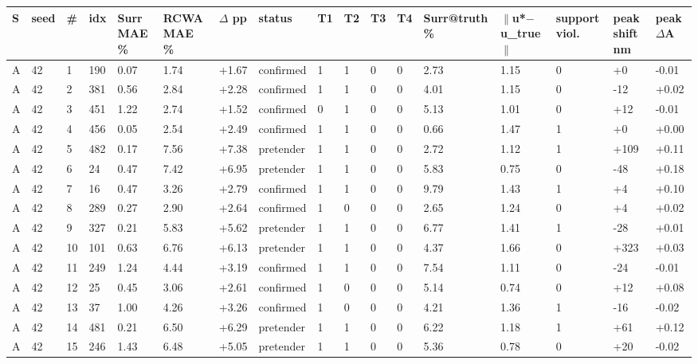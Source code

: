 \documentclass[11pt,a4paper]{article}
\newcounter{none}   %
\begin{document}
\begingroup
\setlength{\tabcolsep}{2pt}\tiny
{}
\label{stab:10}
{\def\LTcaptype{none} %
\begin{longtable}[]{@{}lllllllllllllllll@{}}
\toprule\noalign{}
S & seed & \# & idx & Surr MAE \% & RCWA MAE \% & \ensuremath{\Delta} pp & status & T1 & T2 & T3 & T4 & Surr@truth \% & \ensuremath{\|}u*\ensuremath{-}u\_true\ensuremath{\|} & support viol. & peak shift nm & peak \ensuremath{\Delta}A \\
\midrule\noalign{}
\endhead
\bottomrule\noalign{}
\endlastfoot
A & 42 & 1 & 190 & 0.07 & 1.74 & +1.67 & confirmed & 1 & 1 & 0 & 0 & 2.73 & 1.15 & 0 & +0 & -0.01 \\
A & 42 & 2 & 381 & 0.56 & 2.84 & +2.28 & confirmed & 1 & 1 & 0 & 0 & 4.01 & 1.15 & 0 & -12 & +0.02 \\
A & 42 & 3 & 451 & 1.22 & 2.74 & +1.52 & confirmed & 0 & 1 & 0 & 0 & 5.13 & 1.01 & 0 & +12 & -0.01 \\
A & 42 & 4 & 456 & 0.05 & 2.54 & +2.49 & confirmed & 1 & 1 & 0 & 0 & 0.66 & 1.47 & 1 & +0 & +0.00 \\
A & 42 & 5 & 482 & 0.17 & 7.56 & +7.38 & pretender & 1 & 1 & 0 & 0 & 2.72 & 1.12 & 1 & +109 & +0.11 \\
A & 42 & 6 & 24 & 0.47 & 7.42 & +6.95 & pretender & 1 & 1 & 0 & 0 & 5.83 & 0.75 & 0 & -48 & +0.18 \\
A & 42 & 7 & 16 & 0.47 & 3.26 & +2.79 & confirmed & 1 & 1 & 0 & 0 & 9.79 & 1.43 & 1 & +4 & +0.10 \\
A & 42 & 8 & 289 & 0.27 & 2.90 & +2.64 & confirmed & 1 & 0 & 0 & 0 & 2.65 & 1.24 & 0 & +4 & +0.02 \\
A & 42 & 9 & 327 & 0.21 & 5.83 & +5.62 & pretender & 1 & 1 & 0 & 0 & 6.77 & 1.41 & 1 & -28 & +0.01 \\
A & 42 & 10 & 101 & 0.63 & 6.76 & +6.13 & pretender & 1 & 1 & 0 & 0 & 4.37 & 1.66 & 0 & +323 & +0.03 \\
A & 42 & 11 & 249 & 1.24 & 4.44 & +3.19 & confirmed & 1 & 1 & 0 & 0 & 7.54 & 1.11 & 0 & -24 & -0.01 \\
A & 42 & 12 & 25 & 0.45 & 3.06 & +2.61 & confirmed & 1 & 0 & 0 & 0 & 5.14 & 0.74 & 0 & +12 & +0.08 \\
A & 42 & 13 & 37 & 1.00 & 4.26 & +3.26 & confirmed & 1 & 0 & 0 & 0 & 4.21 & 1.36 & 1 & -16 & -0.02 \\
A & 42 & 14 & 481 & 0.21 & 6.50 & +6.29 & pretender & 1 & 1 & 0 & 0 & 6.22 & 1.18 & 1 & +61 & +0.12 \\
A & 42 & 15 & 246 & 1.43 & 6.48 & +5.05 & pretender & 1 & 1 & 0 & 0 & 5.36 & 0.78 & 0 & +20 & -0.02 \\

\end{longtable}}
\end{document}

